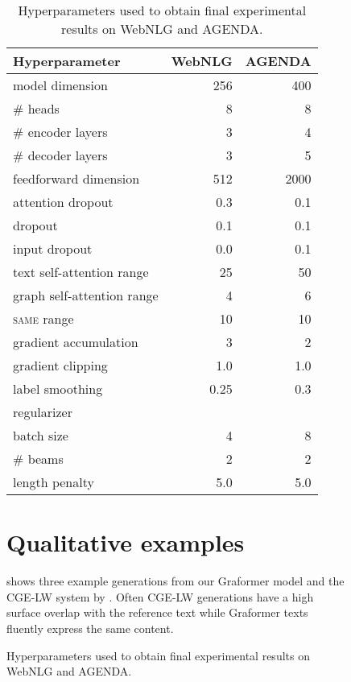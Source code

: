 \documentclass[11pt]{article}
\newcommand{\sameEnt}{\textsc{same}}
\begin{document}
\begin{figure}
\begin{tabular}
\begin{table}[t]
	\centering
	\small
	\begin{tabular}{lrr}
		\toprule
		Hyperparameter & WebNLG & AGENDA\\
		\midrule
		model dimension  & 256 & 400 \\
		\#{} heads & 8 & 8 \\
		\#{} encoder layers  & 3 & 4 \\
		\#{} decoder layers  & 3 & 5 \\
		feedforward dimension & 512 & 2000 \\
		attention dropout & 0.3 & 0.1 \\
		dropout & 0.1 & 0.1 \\
		input dropout & 0.0 & 0.1 \\
		text self-attention range  & 25 & 50 \\
		graph self-attention range  & 4 & 6\\
		\sameEnt{} range  & 10 & 10 \\
		gradient accumulation & 3 & 2 \\
		gradient clipping & 1.0 & 1.0 \\
		label smoothing & 0.25 & 0.3 \\
		 regularizer &  &  \\
		batch size & 4 & 8 \\
		\midrule
		\#{} beams & 2 & 2 \\
		length penalty & 5.0 & 5.0 \\
		\bottomrule
	\end{tabular}
    \caption{Hyperparameters used to obtain final experimental results on WebNLG and AGENDA.}
    \label{tab:hparams}
\end{table}


\section{Qualitative examples}
\label{app:qualitative}

 shows three example generations from our Graformer model and the CGE-LW system by \citet{ribeiro20}.
Often CGE-LW generations have a high surface overlap with the reference text while Graformer texts fluently express the same content.



\end{tabular}
\end{figure}
\end{document}
